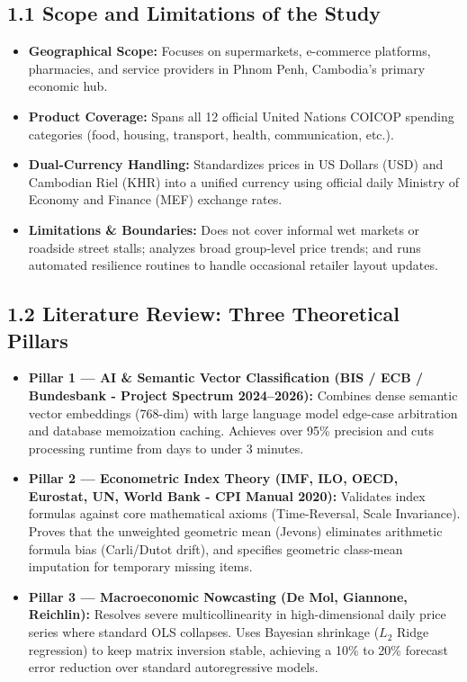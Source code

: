 \documentclass[10pt,a4paper]{article}
\begin{document}
\subsection*{1.1 Scope and Limitations of the Study}
\begin{itemize}[noitemsep,topsep=1pt,leftmargin=*]
    \item \textbf{Geographical Scope:} Focuses on supermarkets, e-commerce platforms, pharmacies, and service providers in Phnom Penh, Cambodia's primary economic hub.
    \item \textbf{Product Coverage:} Spans all 12 official United Nations COICOP spending categories (food, housing, transport, health, communication, etc.).
    \item \textbf{Dual-Currency Handling:} Standardizes prices in US Dollars (USD) and Cambodian Riel (KHR) into a unified currency using official daily Ministry of Economy and Finance (MEF) exchange rates.
    \item \textbf{Limitations \& Boundaries:} Does not cover informal wet markets or roadside street stalls; analyzes broad group-level price trends; and runs automated resilience routines to handle occasional retailer layout updates.
\end{itemize}

\vspace{-0.10cm}
\subsection*{1.2 Literature Review: Three Theoretical Pillars}
\begin{itemize}[noitemsep,topsep=1pt,leftmargin=*]
    \item \textbf{Pillar 1 --- AI \& Semantic Vector Classification (BIS / ECB / Bundesbank - Project Spectrum 2024--2026):} Combines dense semantic vector embeddings (768-dim) with large language model edge-case arbitration and database memoization caching. Achieves over 95\% precision and cuts processing runtime from days to under 3 minutes.
    \item \textbf{Pillar 2 --- Econometric Index Theory (IMF, ILO, OECD, Eurostat, UN, World Bank - CPI Manual 2020):} Validates index formulas against core mathematical axioms (Time-Reversal, Scale Invariance). Proves that the unweighted geometric mean (Jevons) eliminates arithmetic formula bias (Carli/Dutot drift), and specifies geometric class-mean imputation for temporary missing items.
    \item \textbf{Pillar 3 --- Macroeconomic Nowcasting (De Mol, Giannone, Reichlin):} Resolves severe multicollinearity in high-dimensional daily price series where standard OLS collapses. Uses Bayesian shrinkage ($L_2$ Ridge regression) to keep matrix inversion stable, achieving a 10\% to 20\% forecast error reduction over standard autoregressive models.
\end{itemize}
\end{document}
